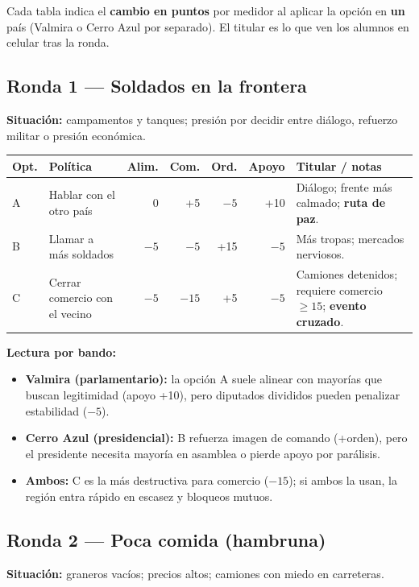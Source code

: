 \documentclass[11pt,a4paper]{article}
\begin{document}
Cada tabla indica el \textbf{cambio en puntos} por medidor al aplicar la opción en \textbf{un} país (Valmira o Cerro Azul por separado). El titular es lo que ven los alumnos en celular tras la ronda.

\subsection{Ronda 1 --- Soldados en la frontera}

\textbf{Situación:} campamentos y tanques; presión por decidir entre diálogo, refuerzo militar o presión económica.

\begin{longtable}{@{}p{0.9cm}p{4.2cm}rrrrp{3.2cm}@{}}
\toprule
\textbf{Opt.} & \textbf{Política} & \textbf{Alim.} & \textbf{Com.} & \textbf{Ord.} & \textbf{Apoyo} & \textbf{Titular / notas} \\
\midrule
\endhead
A & Hablar con el otro país & 0 & +5 & $-5$ & +10 &
  Diálogo; frente más calmado; \textbf{ruta de paz}. \\
B & Llamar a más soldados & $-5$ & $-5$ & +15 & $-5$ &
  Más tropas; mercados nerviosos. \\
C & Cerrar comercio con el vecino & $-5$ & $-15$ & +5 & $-5$ &
  Camiones detenidos; requiere comercio $\geq 15$; \textbf{evento cruzado}. \\
\bottomrule
\end{longtable}

\textbf{Lectura por bando:}
\begin{itemize}
  \item \textbf{Valmira (parlamentario):} la opción A suele alinear con mayorías que buscan legitimidad (apoyo +10), pero diputados divididos pueden penalizar estabilidad ($-5$).
  \item \textbf{Cerro Azul (presidencial):} B refuerza imagen de comando (+orden), pero el presidente necesita mayoría en asamblea o pierde apoyo por parálisis.
  \item \textbf{Ambos:} C es la más destructiva para comercio ($-15$); si ambos la usan, la región entra rápido en escasez y bloqueos mutuos.
\end{itemize}

\subsection{Ronda 2 --- Poca comida (hambruna)}

\textbf{Situación:} graneros vacíos; precios altos; camiones con miedo en carreteras.
\end{document}
